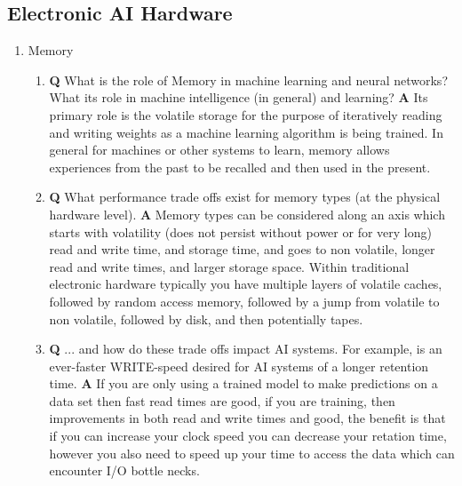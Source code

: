 \documentclass[main.tex]{subfiles}
\begin{document}
\subsection{Electronic AI Hardware}
\begin{enumerate}
\item Memory
    \begin{enumerate}
    \item \textbf{Q} What is the role of Memory in machine learning and neural networks? What its role in machine intelligence (in general) and learning? \textbf{A} Its primary role is the volatile storage for the purpose of iteratively reading and writing weights as a machine learning algorithm is being trained. In general for machines or other systems to learn, memory allows experiences from the past to be recalled and then used in the present.
    \item \textbf{Q} What performance trade offs exist for memory types (at the physical hardware level). \textbf{A} Memory types can be considered along an axis which starts with volatility (does not persist without power or for very long) read and write time, and storage time, and goes to non volatile, longer read and write times, and larger storage space. Within traditional electronic hardware typically you have multiple layers of volatile caches, followed by random access memory, followed by a jump from volatile to non volatile, followed by disk, and then potentially tapes.
    \item \textbf{Q} ... and how do these trade offs impact AI systems. For example, is an ever-faster WRITE-speed desired for AI systems of a longer retention time. \textbf{A} If you are only using a trained model to make predictions on a data set then fast read times are good, if you are training, then improvements in both read and write times and good, the benefit is that if you can increase your clock speed you can decrease your retation time, however you also need to speed up your time to access the data which can encounter I/O bottle necks.
    \end{enumerate}


\end{enumerate}
\end{document}
